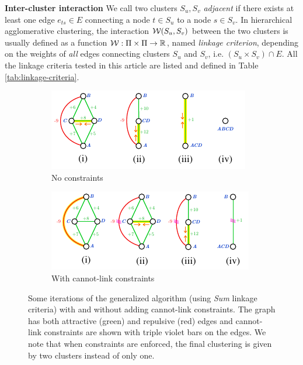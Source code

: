 \textbf{Inter-cluster interaction } We call two clusters $S_u,S_v$ \emph{adjacent} if there exists at least one edge ${e_{ts}\in E}$ connecting a node $t\in S_u$ to a node $s\in S_v$. In hierarchical agglomerative clustering, the interaction $\mathcal{W}(S_u,S_v)$ between the two clusters is usually defined as a function $\mathcal{W}{}:\Pi \times \Pi \rightarrow \mathbb{R}$, named \emph{linkage criterion}, depending on the weights of \emph{all} edges connecting clusters $S_u$ and $S_v$, i.e. $(S_u \times S_v) \cap E$. 
All the linkage criteria tested in this article are listed and defined in Table \ref{tab:linkage-criteria}.

\begin{figure}
\centering
        \begin{subfigure}[t]{0.46 \textwidth}
        \centering
        \includegraphics[width=\textwidth]{figs/example_no_constr.pdf}
        \caption{No constraints}\label{subfig:no_constraints}
    \end{subfigure} \hfill
    \begin{subfigure}[t]{0.46 \textwidth}
        \centering
        \includegraphics[width=\textwidth]{figs/example_with_constr.pdf}
        \caption{With cannot-link constraints}\label{subfig:with_constraints}
    \end{subfigure}
\caption{Some iterations of the generalized algorithm (using \emph{Sum} linkage criteria) with and without adding cannot-link constraints. The graph has both attractive (green) and repulsive (red) edges and cannot-link constraints are shown with triple violet bars on the edges. We note that when constraints are enforced, the final clustering is given by two clusters instead of only one.}
\label{fig:algorithm_with_without_CLC}
\end{figure}
